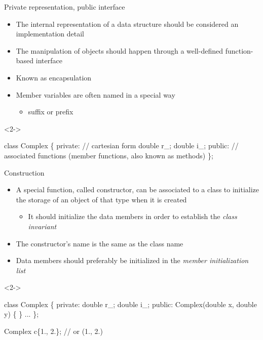 \begin{frame}[fragile]{Private representation, public interface}

  \begin{itemize}
  \item The internal representation of a data structure should be considered an
    implementation detail
  \item The manipulation of objects should happen through a
    well-defined function-based interface
  \item Known as \alert{encapsulation}
  \item<2-> Member variables are often named in a special way
    \begin{itemize}
    \item \code{_} suffix or  prefix
    \end{itemize}
  \end{itemize}

\begin{codeblock}<2->{
\alert<2>{class} Complex \{
 \alert<2-4>{private}: // cartesian form
  double r_;
  double i_;
 \alert<2>{public}:
  // associated functions (member functions, also known as methods)
\};

}\end{codeblock}

\end{frame}

\begin{frame}[fragile]{Construction}

  \begin{itemize}
  \item A special function, called \alert{constructor}, can be associated to a
    class to initialize the storage of an object of that type when it is created
    \begin{itemize}
    \item It should initialize the data members in order to establish the
      \textit{class invariant}
    \end{itemize}
  \item The constructor's name is the same as the class name
  \item<3-> Data members should preferably be initialized in the \textit{member
      initialization list}
  \end{itemize}

  \begin{codeblock}<2->{
class \alert<2>{Complex} \{
 private:
  double r_;
  double i_;
 public:
  \alert<2>{Complex}(double x, double y)
  \{  \}
  ...
\};

Complex c\{1., 2.\}; // or (1., 2.)}\end{codeblock}

\end{frame}

